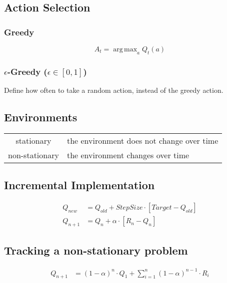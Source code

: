 \documentclass[10pt, landscape, a4paper]{article}
\DeclareMathOperator*{\argmax}{arg\,max}
\begin{document}
\begin{multicols}{3}
        \subsection{Action Selection}

        \subsubsection{Greedy}
        \begin{equation}
            A_{t} = \argmax_{a} Q_t(a)
        \end{equation}

        \subsubsection{$\epsilon$-Greedy ($\epsilon\in\left[ 0,1 \right]$)}
        Define how often to take a random action, instead of the greedy action.

        \subsection{Environments}
        \begin{tabular}{ c l }
            stationary     & the environment does not change over time \\
            non-stationary & the environment changes over time         \\
        \end{tabular}

        \subsection{Incremental Implementation}
        \begin{equation}
            \begin{split}
                Q_{new} &= Q_{old} + StepSize \cdot \left[ Target - Q_{old} \right] \\
                Q_{n+1} &= Q_n + \alpha \cdot \left[ R_n - Q_n \right]
            \end{split}
        \end{equation}

        \subsection{Tracking a non-stationary problem}
        \begin{equation}
            \begin{split}
                Q_{n+1} &= (1-\alpha)^n \cdot Q_1 + \sum_{i=1}^{n} (1-\alpha)^{n-1} \cdot R_i \\
            \end{split}
        \end{equation}


\end{multicols}
\end{document}
